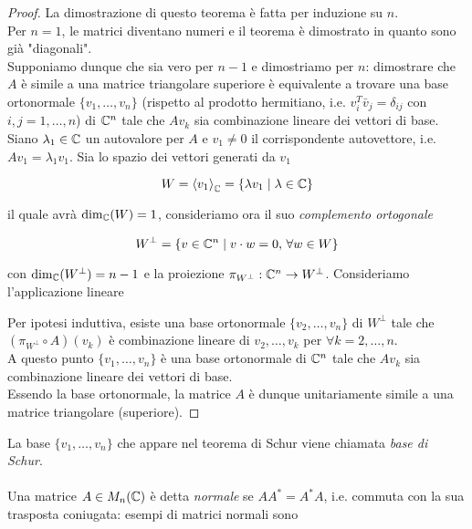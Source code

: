 \begin{proof}
	La dimostrazione di questo teorema è fatta per induzione su $ n $.\\
	Per $ n=1 $, le matrici diventano numeri e il teorema è dimostrato in quanto sono già "diagonali".\\
	Supponiamo dunque che sia vero per $ n-1 $ e dimostriamo per $ n $: dimostrare che $ A $ è simile a una matrice triangolare superiore è equivalente a trovare una base ortonormale $ \{v_{1},\dots,v_{n}\} $ (rispetto al prodotto hermitiano, i.e. $ v_{i}^{T} \bar{v}_{j} = \delta_{ij} $ con $ i,j=1,\dots,n $) di $ \mathbb{C}^{n} $ tale che $ A v_{k} $ sia combinazione lineare dei vettori di base.\\
	Siano $ \lambda_{1} \in \mathbb{C} $ un autovalore per $ A $ e $ v_{1} \neq 0 $ il corrispondente autovettore, i.e. $ A v_{1} = \lambda_{1} v_{1} $. Sia lo spazio dei vettori generati da $ v_{1} $
	
	\begin{equation}
		W = \expval{v_{1}}_{\mathbb{C}} = \{ \lambda v_{1} \mid \lambda \in \mathbb{C} \}
	\end{equation}
	
	il quale avrà $ \dim_{\mathbb{C}}(W) = 1 $, consideriamo ora il suo \textit{complemento ortogonale}
	
	\begin{equation}
		W^{\perp} = \{ v\in \mathbb{C}^{n} \mid v \cdot w = 0, \, \forall w \in W \}
	\end{equation}

	con $ \dim_{\mathbb{C}}(W^{\perp}) = n-1 $ e la proiezione $ \pi_{W^{\perp}} : \mathbb{C}^{n} \to W^{\perp} $. Consideriamo l'applicazione lineare
	
	
	Per ipotesi induttiva, esiste una base ortonormale $ \{v_{2},\dots,v_{n}\} $ di $ W^{\perp} $ tale che $ (\pi_{W^{\perp}} \circ A)(v_{k}) $ è combinazione lineare di $ v_{2},\dots,v_{k} $ per $ \forall k=2,\dots,n $.\\
	A questo punto $ \{v_{1},\dots,v_{n}\} $ è una base ortonormale di $ \mathbb{C}^{n} $ tale che $ A v_{k} $ sia combinazione lineare dei vettori di base.\\
	Essendo la base ortonormale, la matrice $ A $ è dunque unitariamente simile a una matrice triangolare (superiore).
\end{proof}

La base $ \{v_{1},\dots,v_{n}\} $ che appare nel teorema di Schur viene chiamata \textit{base di Schur}.\\\\
%
Una matrice $ A \in M_{n}(\mathbb{C}) $ è detta \textit{normale} se $ A A^{*} = A^{*} A $, i.e. commuta con la sua trasposta coniugata: esempi di matrici normali sono

